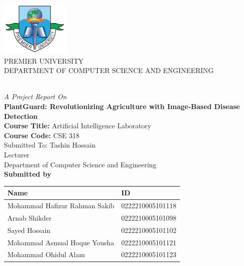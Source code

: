 
\thispagestyle{empty} %



{
	\thispagestyle{empty}
	\centering
	\normalsize
	  
        \includegraphics[width=1.3in]{Images/PUClogo.png}\\

	{PREMIER UNIVERSITY}\\
	{DEPARTMENT OF COMPUTER SCIENCE AND ENGINEERING}\\
	\\[1.5cm]
	{\textit{A Project Report On}\\
	{\bf PlantGuard: Revolutionizing Agriculture with Image-Based Disease Detection}\\[1.5cm]

     {\bf Course Title:} Artificial Intelligence Laboratory\\
     {\bf Course Code:}  CSE 318\\[1.5cm]

        Submitted To: 
          Tashin Hossain\\
          Lecturer \\
          Department of Computer Science and Engineering\\[1.5cm]
    

        \large
    \textbf {Submitted by}\\
    \begin{center}
        \renewcommand{\arraystretch}{1.5} %
        \begin{tabular}{|>{\raggedright\arraybackslash}p{}|p{}|} %
        \hline
        \textbf{Name} & \textbf{ID} \\
        \hline
        Mohammad Hafizur Rahman Sakib & 0222210005101118 \\
        \hline
        Arnab Shikder & 0222210005101098 \\
        \hline
        Sayed Hossain & 0222210005101102 \\
        \hline
        Mohammad Asmual Hoque Yousha & 0222210005101121 \\
        \hline
         Mohammad Ohidul Alam & 0222210005101123 \\
        \hline
        \end{tabular}
        \end{center}
    \vspace{0.5in}
	
}

}

